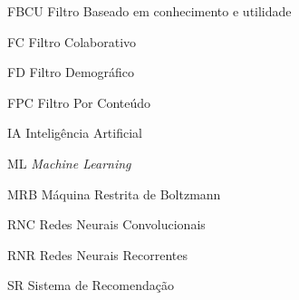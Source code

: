 \begin{siglas}
  \item[FBCU] Filtro Baseado em conhecimento e utilidade
  \item[FC] Filtro Colaborativo
  \item[FD] Filtro Demográfico
  \item[FPC] Filtro Por Conteúdo
  \item[IA] Inteligência Artificial
  \item[ML] \textit{Machine Learning}
  \item[MRB] Máquina Restrita de Boltzmann
  \item[RNC] Redes Neurais Convolucionais
  \item[RNR] Redes Neurais Recorrentes
  \item[SR] Sistema de Recomendação
\end{siglas}
